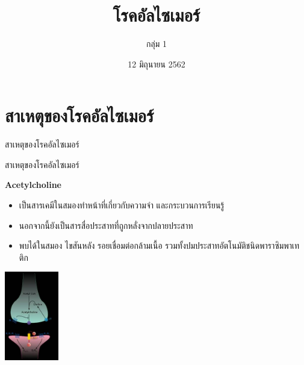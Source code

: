 \documentclass[xetex,serif]{beamer}
\title{โรคอัลไซเมอร์}
\author{กลุ่ม 1}
\date{12 มิถุนายน 2562}
\institute{ห้อง 39}
\begin{document}
\begin{frame}
  \maketitle
\end{frame}

\section{สาเหตุของโรคอัลไซเมอร์}

\begin{frame}{สาเหตุของโรคอัลไซเมอร์}

\begin{center}
\end{center}

\end{frame}

\begin{frame}{สาเหตุของโรคอัลไซเมอร์}

  {\large \textbf{Acetylcholine}}
  \begin{itemize}
    \item เป็นสารเคมีในสมองทำหน้าที่เกี่ยวกับความจำ และกระบวนการเรียนรู้
    \item นอกจากนี้ยังเป็นสารสื่อประสาทที่ถูกหลั่งจากปลายประสาท
    \item พบได้ในสมอง ไขสันหลัง รอยเชื่อมต่อกล้ามเนื้อ รวมทั้งปมประสาทอัตโนมัติชนิดพาราซิมพาเทติก
  \end{itemize}
  \begin{center}
    \includegraphics[height=110pt]{img0.jpg}
  \end{center}
\end{frame}
\end{document}
